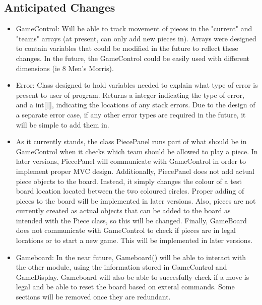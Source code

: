 \documentclass[12pt]{article}
\begin{document}
	\subsection{Anticipated Changes}
	\begin{itemize}
	\item    GameControl: Will be able to track movement of pieces in the "current" and "teams" arrays (at present, can only add new pieces in). Arrays were designed to contain variables that could be modified in the future to reflect these changes.
	    In the future, the GameControl could be easily used with different dimensions (ie 8 Men's Morris).  
	\item    Error: Class designed to hold variables needed to explain what type of error is present to user of program. Returns a integer indicating the type of error, and a int[][], indicating the locations of any stack errors. Due to the design of a separate error case, if any other error types are required in the future, it will be simple to add them in.
	\item	As it currently stands, the class PiecePanel runs part of what should be in GameControl when it checks which team should be allowed to play a piece. In later versions, PiecePanel will communicate with GameControl in order to implement proper MVC design. Additionally, PiecePanel does not add actual piece objects to the board. Instead, it simply changes the colour of a test board location located between the two coloured circles. Proper adding of pieces to the board will be implemented in later versions. Also, pieces are not currently created as actual objects that can be added to the board as intended with the Piece class, so this will be changed. Finally, GameBoard does not communicate with GameControl to check if pieces are in legal locations or to start a new game. This will be implemented in later versions.
	\item Gameboard: In the near future, Gameboard() will be able to interact with the other module, using the information stored in GameControl and GameDisplay. Gameboard will also be able to succesfully check if a move is legal and be able to reset the board based on exteral commands. Some sections will be removed once they are redundant.
	\end{itemize}
	
\end{document}
